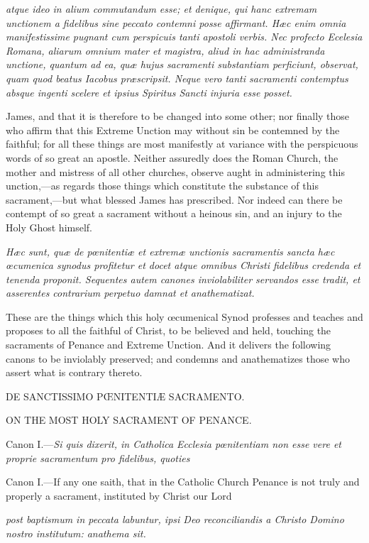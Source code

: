 \emph{atque ideo in alium commutandum esse; et denique, qui hanc extremam unctionem a fidelibus sine peccato contemni posse affirmant. Hæc enim omnia manifestissime pugnant cum perspicuis tanti apostoli verbis. Nec profecto Ecelesia Romana, aliarum omnium mater et magistra, aliud in hac administranda unctione, quantum ad ea, quæ hujus sacramenti substantiam perficiunt, observat, quam quod beatus Iacobus præscripsit. Neque vero tanti sacramenti contemptus absque ingenti scelere et ipsius Spiritus Sancti injuria esse posset.}

James, and that it is therefore to be changed into some other; nor finally those who affirm that this Extreme Unction may without sin be contemned by the faithful; for all these things are most manifestly at variance with the perspicuous words of so great an apostle. Neither assuredly does the Roman Church, the mother and mistress of all other churches, observe aught in administering this unction,—as regards those things which constitute the substance of this sacrament,—but what blessed James has prescribed. Nor indeed can there be contempt of so great a sacrament without a heinous sin, and an injury to the Holy Ghost himself.

\emph{Hæc sunt, quæ de pœnitentiæ et extremæ unctionis sacramentis sancta hæc œcumenica synodus profitetur et docet atque omnibus Christi fidelibus credenda et tenenda proponit. Sequentes autem canones inviolabiliter servandos esse tradit, et asserentes contrarium perpetuo damnat et anathematizat.}

These are the things which this holy œcumenical Synod professes and teaches and proposes to all the faithful of Christ, to be believed and held, touching the sacraments of Penance and Extreme Unction. And it delivers the following canons to be inviolably preserved; and condemns and anathematizes those who assert what is contrary thereto.

DE SANCTISSIMO PŒNITENTIÆ SACRAMENTO.

ON THE MOST HOLY SACRAMENT OF PENANCE.

Canon I.—\emph{Si quis dixerit, in Catholica Ecclesia pœnitentiam non esse vere et proprie sacramentum pro fidelibus, quoties }

Canon I.—If any one saith, that in the Catholic Church Penance is not truly and properly a sacrament, instituted by Christ our Lord

\emph{post baptismum in peccata labuntur, ipsi Deo reconciliandis a Christo Domino nostro institutum: anathema sit.}


